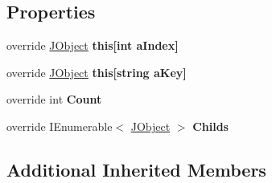 \subsection*{Properties}
\begin{DoxyCompactItemize}
\item 
\hypertarget{class_simple_j_s_o_n_1_1_j_array_af84eea2e574276d27cbe2a0a159c2650}{override \hyperlink{class_simple_j_s_o_n_1_1_j_object}{J\+Object} {\bfseries this\mbox{[}int a\+Index\mbox{]}}}\label{class_simple_j_s_o_n_1_1_j_array_af84eea2e574276d27cbe2a0a159c2650}

\item 
\hypertarget{class_simple_j_s_o_n_1_1_j_array_a92af5af8ae85fbe479bfc8c841860b36}{override \hyperlink{class_simple_j_s_o_n_1_1_j_object}{J\+Object} {\bfseries this\mbox{[}string a\+Key\mbox{]}}}\label{class_simple_j_s_o_n_1_1_j_array_a92af5af8ae85fbe479bfc8c841860b36}

\item 
\hypertarget{class_simple_j_s_o_n_1_1_j_array_a130d533852e822b56086c527a517fcff}{override int {\bfseries Count}}\label{class_simple_j_s_o_n_1_1_j_array_a130d533852e822b56086c527a517fcff}

\item 
\hypertarget{class_simple_j_s_o_n_1_1_j_array_a25b7adedb7004c7dcf8198f8b377c11a}{override I\+Enumerable$<$ \hyperlink{class_simple_j_s_o_n_1_1_j_object}{J\+Object} $>$ {\bfseries Childs}}\label{class_simple_j_s_o_n_1_1_j_array_a25b7adedb7004c7dcf8198f8b377c11a}

\end{DoxyCompactItemize}
\subsection*{Additional Inherited Members}
